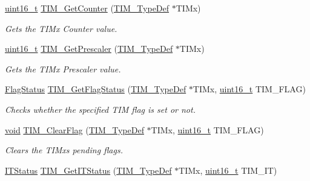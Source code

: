 \begin{DoxyCompactItemize}
\hyperlink{_p_e___types_8h_a1f1825b69244eb3ad2c7165ddc99c956}{uint16\+\_\+t} \hyperlink{group___t_i_m___private___functions_gab6826b144ae70e206f51ae8af5318a93}{T\+I\+M\+\_\+\+Get\+Counter} (\hyperlink{struct_t_i_m___type_def}{T\+I\+M\+\_\+\+Type\+Def} $\ast$T\+I\+Mx)
\begin{DoxyCompactList}\small\item\em Gets the T\+I\+Mx Counter value. \end{DoxyCompactList}\item 
\hyperlink{_p_e___types_8h_a1f1825b69244eb3ad2c7165ddc99c956}{uint16\+\_\+t} \hyperlink{group___t_i_m___private___functions_ga427eb6e533480e02a27cd0ca876183d6}{T\+I\+M\+\_\+\+Get\+Prescaler} (\hyperlink{struct_t_i_m___type_def}{T\+I\+M\+\_\+\+Type\+Def} $\ast$T\+I\+Mx)
\begin{DoxyCompactList}\small\item\em Gets the T\+I\+Mx Prescaler value. \end{DoxyCompactList}\item 
\hyperlink{agilefox_2library_2inc_2stm32f10x__type_8h_a89136caac2e14c55151f527ac02daaff}{Flag\+Status} \hyperlink{group___t_i_m___private___functions_ga0adcbbd5e838ec8642e7a9b80075f41f}{T\+I\+M\+\_\+\+Get\+Flag\+Status} (\hyperlink{struct_t_i_m___type_def}{T\+I\+M\+\_\+\+Type\+Def} $\ast$T\+I\+Mx, \hyperlink{_p_e___types_8h_a1f1825b69244eb3ad2c7165ddc99c956}{uint16\+\_\+t} T\+I\+M\+\_\+\+F\+L\+AG)
\begin{DoxyCompactList}\small\item\em Checks whether the specified T\+IM flag is set or not. \end{DoxyCompactList}\item 
\hyperlink{usb__devapi_8h_afabf60e7f57651d6d595a02c75f07cd0}{void} \hyperlink{group___t_i_m___private___functions_ga46568c7b254941dc53e785342d60baf3}{T\+I\+M\+\_\+\+Clear\+Flag} (\hyperlink{struct_t_i_m___type_def}{T\+I\+M\+\_\+\+Type\+Def} $\ast$T\+I\+Mx, \hyperlink{_p_e___types_8h_a1f1825b69244eb3ad2c7165ddc99c956}{uint16\+\_\+t} T\+I\+M\+\_\+\+F\+L\+AG)
\begin{DoxyCompactList}\small\item\em Clears the T\+I\+Mx\textquotesingle{}s pending flags. \end{DoxyCompactList}\item 
\hyperlink{agilefox_2library_2inc_2stm32f10x__type_8h_aacbd7ed539db0aacd973a0f6eca34074}{I\+T\+Status} \hyperlink{group___t_i_m___private___functions_ga0827a0b411707304f76d33050727c24d}{T\+I\+M\+\_\+\+Get\+I\+T\+Status} (\hyperlink{struct_t_i_m___type_def}{T\+I\+M\+\_\+\+Type\+Def} $\ast$T\+I\+Mx, \hyperlink{_p_e___types_8h_a1f1825b69244eb3ad2c7165ddc99c956}{uint16\+\_\+t} T\+I\+M\+\_\+\+IT)

\end{DoxyCompactItemize}
